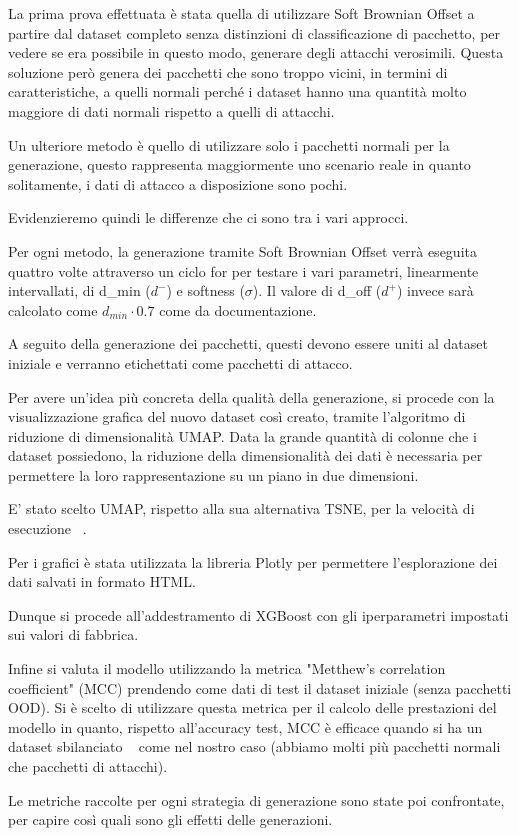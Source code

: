 La prima prova effettuata è stata quella di utilizzare Soft Brownian Offset a partire dal dataset completo senza distinzioni di classificazione di pacchetto, per vedere se era possibile in questo modo, generare degli attacchi verosimili. Questa soluzione però genera dei pacchetti che sono troppo vicini, in termini di caratteristiche, a quelli normali perché i dataset hanno una quantità molto maggiore di dati normali rispetto a quelli di attacchi.

Un ulteriore metodo è quello di utilizzare solo i pacchetti normali per la generazione, questo rappresenta maggiormente uno scenario reale in quanto solitamente, i dati di attacco a disposizione sono pochi.

Evidenzieremo quindi le differenze che ci sono tra i vari approcci.

Per ogni metodo, la generazione tramite Soft Brownian Offset verrà eseguita quattro volte attraverso un ciclo for per testare i vari parametri, linearmente intervallati, di d\_min ($d^{-}$) e softness ($\sigma$). Il valore di d\_off ($d^{+}$) invece sarà calcolato come $d_{min} \cdot 0.7$ come da documentazione.

A seguito della generazione dei pacchetti, questi devono essere uniti al dataset iniziale e verranno etichettati come pacchetti di attacco.

Per avere un'idea più concreta della qualità della generazione, si procede con la visualizzazione grafica del nuovo dataset così creato, tramite l'algoritmo di riduzione di dimensionalità UMAP. Data la grande quantità di colonne che i dataset possiedono, la riduzione della dimensionalità dei dati è necessaria per permettere la loro rappresentazione su un piano in due dimensioni. 

E' stato scelto UMAP, rispetto alla sua alternativa TSNE, per la velocità di esecuzione ~\cite{umap}.

Per i grafici è stata utilizzata la libreria Plotly per permettere l'esplorazione dei dati salvati in formato HTML.


Dunque si procede all'addestramento di XGBoost con gli iperparametri impostati sui valori di fabbrica.

Infine si valuta il modello utilizzando la metrica "Metthew's correlation coefficient" (MCC) prendendo come dati di test il dataset iniziale (senza pacchetti OOD).
Si è scelto di utilizzare questa metrica per il calcolo delle prestazioni del modello in quanto, rispetto all'accuracy test, MCC è efficace quando si ha un dataset sbilanciato  ~\cite{chiccoAdvantagesMatthewsCorrelation2020} come nel nostro caso (abbiamo molti più pacchetti normali che pacchetti di attacchi).

Le metriche raccolte per ogni strategia di generazione sono state poi confrontate, per capire così quali sono gli effetti delle generazioni.




